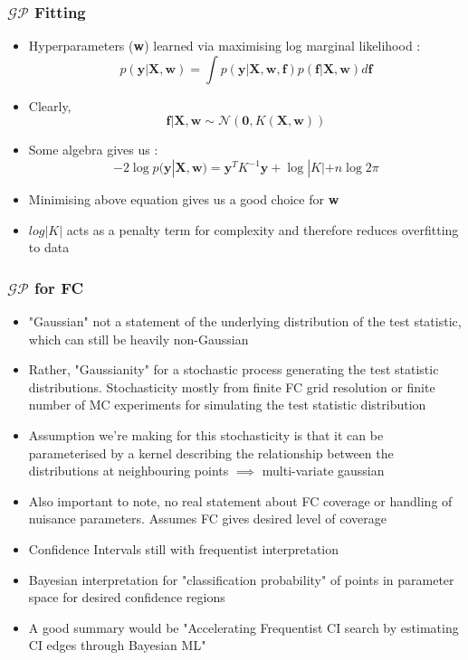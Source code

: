 \documentclass[9pt, aspectratio=169]{beamer}
\begin{document}
\begin{frame}
  \frametitle{$\mathcal{GP}$ Fitting}
  \begin{itemize}
    \item Hyperparameters (\textbf{w}) learned via maximising log marginal likelihood : 
      \begin{equation*}
        p(\textbf{y} | \textbf{X}, \textbf{w}) = \int p(\textbf{y} | \textbf{X}, \textbf{w}, \textbf{f})p(\textbf{f} | \textbf{X}, \textbf{w}) d\textbf{f}
      \end{equation*}
    \item Clearly,
      \begin{equation*}
        \textbf{f} | \textbf{X}, \textbf{w} \sim \mathcal{N}(\textbf{0}, K(\textbf{X}, \textbf{w}))
      \end{equation*}
    \item Some algebra gives us : 
      \begin{equation*}
        -2\log p(\textbf{y} | \textbf{X}, \textbf{w}) = \textbf{y}^{T}K^{-1}\textbf{y} + \log |K| + n\log 2\pi
      \end{equation*}
    \item Minimising above equation gives us a good choice for \textbf{w}
    \item $log |K|$ acts as a penalty term for complexity and therefore reduces overfitting to data
  \end{itemize}
\end{frame}

\begin{frame}
  \frametitle{$\mathcal{GP}$ for FC}
  \begin{itemize}
    \item "Gaussian" not a statement of the underlying distribution of the test statistic, which can still be heavily non-Gaussian
    \item Rather, "Gaussianity" for a stochastic process generating the test statistic distributions. Stochasticity mostly from finite FC grid resolution or finite number of MC experiments for simulating the test statistic distribution 
    \item Assumption we're making for this stochasticity is that it can be parameterised by a kernel describing the relationship between the distributions at neighbouring points $\implies$ multi-variate gaussian
      \bigskip
    \item Also important to note, no real statement about FC coverage or handling of nuisance parameters. Assumes FC gives desired level of coverage
    \item Confidence Intervals still with frequentist interpretation
    \item Bayesian interpretation for "classification probability" of points in parameter space for desired confidence regions
    \item A good summary would be "Accelerating Frequentist CI search by estimating CI edges through Bayesian ML"
  \end{itemize}
\end{frame}
\end{document}
